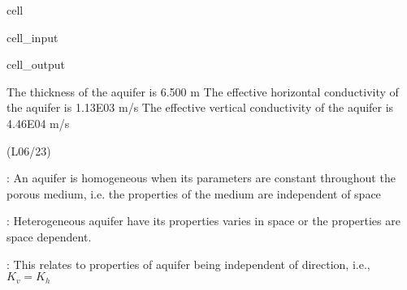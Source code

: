 \documentclass[letterpaper,10pt,english]{jupyterBook}
\begin{document}
\begin{sphinxuseclass}{cell}
\begin{sphinxVerbatimInput}
\begin{sphinxuseclass}{cell_input}
\begin{sphinxVerbatim}[commandchars=\\\{\}]
 
 
 
\end{sphinxVerbatim}

\end{sphinxuseclass}\end{sphinxVerbatimInput}
\begin{sphinxVerbatimOutput}

\begin{sphinxuseclass}{cell_output}
\begin{sphinxVerbatim}[commandchars=\\\{\}]
The thickness of the aquifer is 6.500 m
The effective horizontal conductivity of the aquifer is 1.13E\PYGZhy{}03 m/s
The effective vertical conductivity of the aquifer is 4.46E\PYGZhy{}04 m/s
\end{sphinxVerbatim}

\end{sphinxuseclass}\end{sphinxVerbatimOutput}

\end{sphinxuseclass}
\sphinxAtStartPar
{} (L06/23)

\sphinxAtStartPar
{}: An aquifer is homogeneous when its parameters are constant throughout the porous medium, i.e. the properties of the medium are independent of space

\sphinxAtStartPar
{}: Heterogeneous aquifer have its properties varies in space or the properties are space dependent.

\sphinxAtStartPar
{}: This relates to properties of aquifer being independent of direction, i.e., \(K_v = K_h\)
\end{document}
